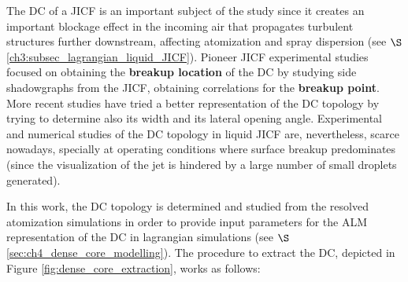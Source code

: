 The DC of a JICF is an important subject of the study since it creates an important blockage effect in the incoming air that propagates turbulent structures further downstream, affecting atomization and spray dispersion (see $\S$\ref{ch3:subsec_lagrangian_liquid_JICF}). Pioneer JICF experimental studies \citepColor[wu_breakup_1997] focused on obtaining the \textbf{breakup location} of the DC by studying side shadowgraphs from the JICF, obtaining correlations for the \textbf{breakup point}. More recent studies  have tried a better representation of the DC topology by trying to determine also its width and its lateral opening angle. Experimental and numerical studies of the DC topology in liquid JICF are, nevertheless, scarce nowadays, specially at operating conditions where surface breakup predominates (since the visualization of the jet is hindered by a large number of small droplets generated).

In this work, the DC topology is determined and studied from the resolved atomization simulations in order to provide input parameters for the ALM representation of the DC in lagrangian simulations (see $\S$\ref{sec:ch4_dense_core_modelling}). The procedure to extract the DC, depicted in Figure \ref{fig:dense_core_extraction}, works as follows:


